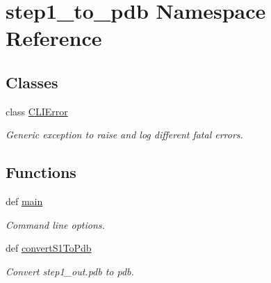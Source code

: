 \hypertarget{namespacestep1__to__pdb}{\section{step1\-\_\-to\-\_\-pdb Namespace Reference}
\label{namespacestep1__to__pdb}
}
\subsection*{Classes}
\begin{DoxyCompactItemize}
\item 
class \hyperlink{classstep1__to__pdb_1_1_c_l_i_error}{C\-L\-I\-Error}
\begin{DoxyCompactList}\small\item\em Generic exception to raise and log different fatal errors. \end{DoxyCompactList}\end{DoxyCompactItemize}
\subsection*{Functions}
\begin{DoxyCompactItemize}
\item 
def \hyperlink{namespacestep1__to__pdb_aec89a7b48b40b40c9b42a832e7165e86}{main}
\begin{DoxyCompactList}\small\item\em Command line options. \end{DoxyCompactList}\item 
def \hyperlink{namespacestep1__to__pdb_a2b307c70e3aba3de97831cc829e236da}{convert\-S1\-To\-Pdb}
\begin{DoxyCompactList}\small\item\em Convert step1\-\_\-out.\-pdb to pdb. \end{DoxyCompactList}\end{DoxyCompactItemize}
